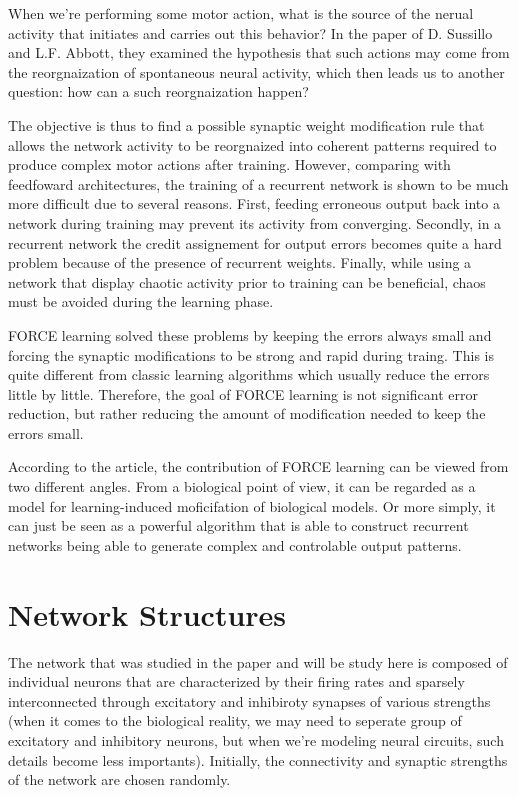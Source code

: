 When we're performing some motor action, what is the source of the nerual
activity that initiates and carries out this behavior? In the paper of
D. Sussillo and L.F. Abbott, they examined the hypothesis that such actions 
may come from the reorgnaization of spontaneous neural activity, which then
leads us to another question: how can a such reorgnaization happen?

The objective is thus to find a possible synaptic weight modification rule
that allows the network activity to be reorgnaized into coherent patterns 
required to produce complex motor actions after training. However, comparing
with feedfoward architectures, the training of a recurrent network is
shown to be much more difficult due to several reasons.
First, feeding erroneous output back into a network during training may
prevent its activity from converging. Secondly, in a recurrent network
the credit assignement for output errors becomes quite a hard problem because
of the presence of recurrent weights. Finally, while using a network that
display chaotic activity prior to training can be beneficial, chaos
must be avoided during the learning phase.

FORCE learning solved these problems by keeping the errors always small
and forcing the synaptic modifications to be strong and rapid during traing.
This is quite different from classic learning algorithms which usually
reduce the errors little by little. Therefore, the goal of FORCE learning
is not significant error reduction, but rather reducing the amount of
modification needed to keep the errors small.

According to the article, the contribution of FORCE learning can be
viewed from two different angles. From a biological point of view, it can
be regarded as a model for learning-induced moficifation of biological
models. Or more simply, it can just be seen as a powerful algorithm that
is able to construct recurrent networks being able to generate complex
and controlable output patterns.

\section{Network Structures}

The network that was studied in the paper and will be study here is composed
of individual neurons that are characterized by their firing rates and
sparsely interconnected through excitatory and inhibiroty synapses of 
various strengths (when it comes to the biological reality, we may need to
seperate group of excitatory and inhibitory neurons, but when we're modeling
neural circuits, such details become less importants). Initially, the
connectivity and synaptic strengths of the network are chosen randomly.

